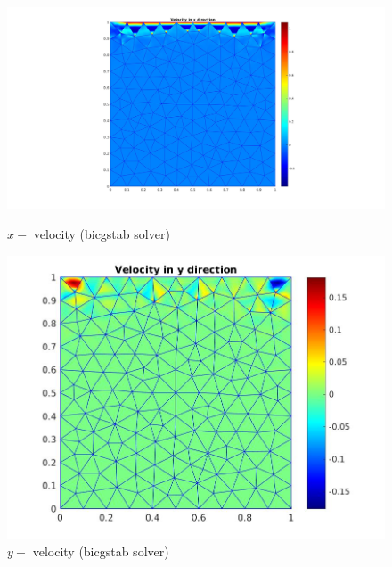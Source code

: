 \documentclass[a4paper]{book}
\begin{document}
\begin{figure}
  \begin{minipage}[c]{0.67\textwidth}
    \includegraphics[width=\textwidth]{lid_bicgstab_vx.jpg}
  \end{minipage}\hfill
  \begin{minipage}[c]{0.3\textwidth}
    \caption{$x-$ velocity (bicgstab solver)} \label{x_vel_stoke_bicgstab_lid}
  \end{minipage}
  \begin{minipage}[c]{0.67\textwidth}
    \includegraphics[width=\textwidth]{lid_bicgstab_vy.jpg}
  \end{minipage}\hfill
  \begin{minipage}[c]{0.3\textwidth}
    \caption{$y-$ velocity (bicgstab solver)} \label{y_vel_stoke_bicgstab_lid}
  \end{minipage}
  \begin{minipage}[c]{0.67\textwidth}

\end{minipage}
\end{figure}
\end{document}
